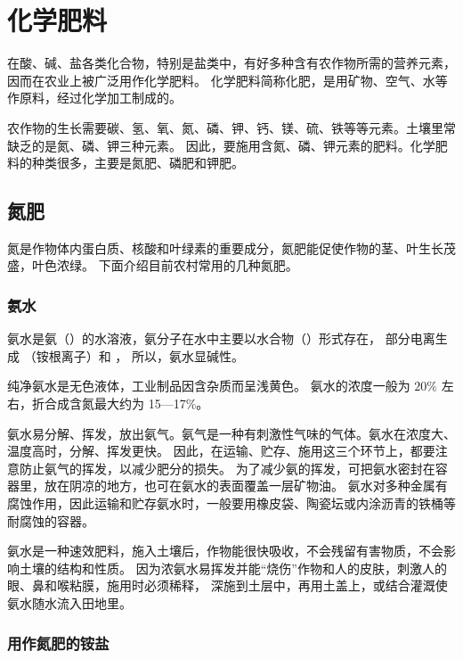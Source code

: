 \section{化学肥料}\label{sec:5-7}

在酸、碱、盐各类化合物，特别是盐类中，有好多种含有农作物所需的营养元素，因而在农业上被广泛用作化学肥料。
化学肥料简称化肥，是用矿物、空气、水等作原料，经过化学加工制成的。

农作物的生长需要碳、氢、氧、氮、磷、钾、钙、镁、硫、铁等等元素。土壤里常缺乏的是氮、磷、钾三种元素。
因此，要施用含氮、磷、钾元素的肥料。化学肥料的种类很多，主要是氮肥、磷肥和钾肥。


\subsection{氮肥}

氮是作物体内蛋白质、核酸和叶绿素的重要成分，氮肥能促使作物的茎、叶生长茂盛，叶色浓绿。
下面介绍目前农村常用的几种氮肥。

\subsubsection{氨水}

氨水是氨（）的水溶液，氨分子在水中主要以水合物（）形式存在，
部分电离生成 （铵根离子）和 ， 所以，氨水显碱性。
\begin{fangchengshi}
\end{fangchengshi}

纯净氨水是无色液体，工业制品因含杂质而呈浅黄色。
氨水的浓度一般为 $20\%$ 左右，折合成含氮最大约为 15—17\%。

氨水易分解、挥发，放出氨气。氨气是一种有刺激性气味的气体。氨水在浓度大、温度高时，分解、挥发更快。
因此，在运输、贮存、施用这三个环节上，都要注意防止氨气的挥发，以减少肥分的损失。
为了减少氨的挥发，可把氨水密封在容器里，放在阴凉的地方，也可在氨水的表面覆盖一层矿物油。
氨水对多种金属有腐蚀作用，因此运输和贮存氨水时，一般要用橡皮袋、陶瓷坛或内涂沥青的铁桶等耐腐蚀的容器。

氨水是一种速效肥料，施入土壤后，作物能很快吸收，不会残留有害物质，不会影响土壤的结构和性质。
因为浓氨水易挥发并能“烧伤”作物和人的皮肤，刺激人的眼、鼻和喉粘膜，施用时必须稀释，
深施到土层中，再用土盖上，或结合灌溉使氨水随水流入田地里。


\subsubsection{用作氮肥的铵盐\footnotemark}

